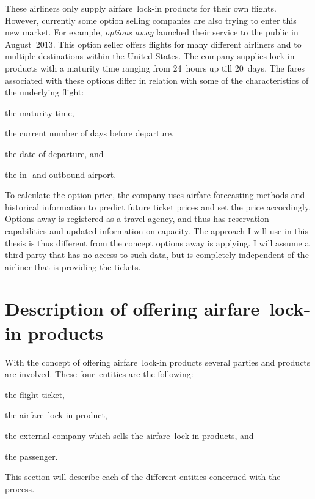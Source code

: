 These airliners only supply airfare~lock-in products for their own flights. However, currently some option selling companies are also trying to enter this new market. For example, \emph{options away} launched their service to the public in August~2013. This option seller offers flights for many different airliners and to multiple destinations within the United States. The company supplies lock-in products with a maturity time ranging from 24~hours up till 20~days. The fares associated with these options differ in relation with some of the characteristics of the underlying flight:

\begin{compactitem}
    \item the maturity time,
    \item the current number of days before departure,
    \item the date of departure, and
    \item the in- and outbound airport.
\end{compactitem}

To calculate the option price, the company uses airfare forecasting methods and historical information to predict future ticket prices and set the price accordingly. Options away is registered as a travel agency, and thus has reservation capabilities and updated information on capacity. The approach I will use in this thesis is thus different from the concept options away is applying. I will assume a third party that has no access to such data, but is completely independent of the airliner that is providing the tickets.


\section{Description of offering airfare~lock-in products}

With the concept of offering airfare~lock-in products several parties and products are involved. These four~entities are the following:
\begin{compactitem}
\item the flight ticket,
\item the airfare~lock-in product,
\item the external company which sells the airfare~lock-in products, and
\item the passenger.
\end{compactitem}

\noindent
This section will describe each of the different entities concerned with the process.


